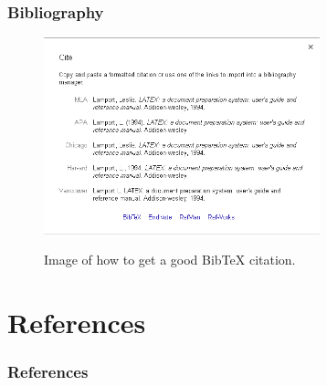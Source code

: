 \documentclass{beamer}
\newcommand\Fontvi{\fontsize{9}{7.2}\selectfont}
\begin{document}
\begin{frame}
\frametitle{Bibliography}
\begin{figure}
  \centering
  \includegraphics[width=8cm]{bibtex1.png}\\
  \caption{Image of how to get a good BibTeX citation.}\label{BibTeX_citation}
\end{figure}
\end{frame}



\section{References}
\begin{frame}[allowframebreaks]
\frametitle{References}
\nocite{*}
\Fontvi
\end{frame}
\end{document}
